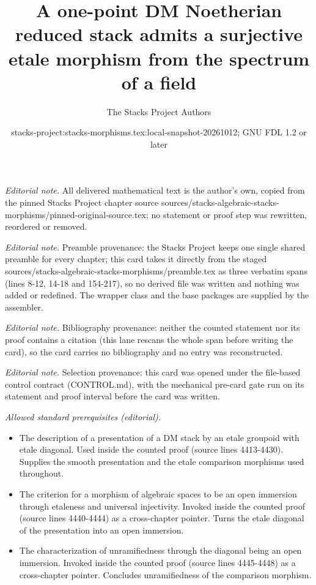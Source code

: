 \documentclass[10pt,a4paper]{amsart}
\title{A one-point DM Noetherian reduced stack admits a surjective etale morphism from the spectrum of a field}
\author{The Stacks Project Authors}
\date{stacks-project:stacks-morphisms.tex:local-snapshot-20261012; GNU FDL 1.2 or later}
\theoremstyle{plain}
\theoremstyle{definition}
\theoremstyle{remark}
\numberwithin{equation}{subsection}
\begin{document}
\maketitle
\noindent\textit{Editorial note.} All delivered mathematical text is the author's own, copied from the pinned Stacks Project chapter source sources/stacks-algebraic-stacks-morphisms/pinned-original-source.tex; no statement or proof step was rewritten, reordered or removed.\par\medskip
\noindent\textit{Editorial note.} Preamble provenance: the Stacks Project keeps one single shared preamble for every chapter; this card takes it directly from the staged sources/stacks-algebraic-stacks-morphisms/preamble.tex as three verbatim spans (lines 8-12, 14-18 and 154-217), so no derived file was written and nothing was added or redefined. The wrapper class and the base packages are supplied by the assembler.\par\medskip
\noindent\textit{Editorial note.} Bibliography provenance: neither the counted statement nor its proof contains a citation (this lane rescans the whole span before writing the card), so the card carries no bibliography and no entry was reconstructed.\par\medskip
\noindent\textit{Editorial note.} Selection provenance: this card was opened under the file-based control contract (CONTROL.md), with the mechanical pre-card gate run on its statement and proof interval before the card was written.\par\medskip
\noindent\textit{Allowed standard prerequisites (editorial).}\begin{itemize}
\item The description of a presentation of a DM stack by an etale groupoid with etale diagonal. Used inside the counted proof (source lines 4413-4430). Supplies the smooth presentation and the etale comparison morphisms used throughout.
\item The criterion for a morphism of algebraic spaces to be an open immersion through etaleness and universal injectivity. Invoked inside the counted proof (source lines 4440-4444) as a cross-chapter pointer. Turns the etale diagonal of the presentation into an open immersion.
\item The characterization of unramifiedness through the diagonal being an open immersion. Invoked inside the counted proof (source lines 4445-4448) as a cross-chapter pointer. Concludes unramifiedness of the comparison morphism.
\end{itemize}\medskip
\end{document}
